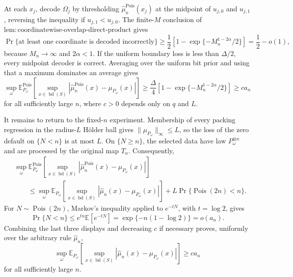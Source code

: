 At each \(x_j\), decode \(\Omega_j\) by thresholding \(\widehat\mu_n^{\mathrm{Pois}}(x_j)\) at the midpoint of \(u_{j,0}\) and \(u_{j,1}\), reversing the inequality if \(u_{j,1}<u_{j,0}\).  The finite-\(M\) conclusion of \(\mathrm{lem:coordinatewise\text{-}overlap\text{-}direct\text{-}product}\) gives
\[
 \Pr\{\text{at least one coordinate is decoded incorrectly}\}
 \geq\frac12\left[1-\exp\{-M_n^{1-2\alpha}/2\}\right]
 =\frac12-o(1),
\]
because \(M_n\to\infty\) and \(2\alpha<1\).  If the uniform boundary loss is less than \(\Delta/2\), every midpoint decoder is correct.  Averaging over the uniform bit prior and using that a maximum dominates an average gives
\[
 \sup_\omega
 \mathbb E_{P_\omega}^{\mathrm{Pois}}\!\left[
 \sup_{x\in\operatorname{bd}(S)}
 |\widehat\mu_n^{\mathrm{Pois}}(x)-\mu_{P_\omega}(x)|
 \right]
 \geq\frac{\Delta}{4}
 \left[1-\exp\{-M_n^{1-2\alpha}/2\}\right]
 \geq c a_n
\]
for all sufficiently large \(n\), where \(c>0\) depends only on \(q\) and \(L\).

It remains to return to the fixed-\(n\) experiment.  Membership of every packing regression in the radius-\(L\) H\"older ball gives \(\lVert\mu_{P_\omega}\rVert_\infty\leq L\), so the loss of the zero default on \(\{N<n\}\) is at most \(L\).  On \(\{N\geq n\}\), the selected data have law \(P_\omega^{\otimes n}\) and are processed by the original map \(T_n\).  Consequently,
\[
\begin{aligned}
 &\sup_\omega
 \mathbb E_{P_\omega}^{\mathrm{Pois}}\!\left[
 \sup_{x\in\operatorname{bd}(S)}
 |\widehat\mu_n^{\mathrm{Pois}}(x)-\mu_{P_\omega}(x)|
 \right]\\
 &\qquad\leq
 \sup_\omega
 \mathbb E_{P_\omega}\!\left[
 \sup_{x\in\operatorname{bd}(S)}
 |\widehat\mu_n(x)-\mu_{P_\omega}(x)|
 \right]
 +L\Pr\{\operatorname{Pois}(2n)<n\}.
\end{aligned}
\]
For \(N\sim\operatorname{Pois}(2n)\), Markov's inequality applied to \(e^{-tN}\), with \(t=\log2\), gives
\[
 \Pr\{N<n\}
 \leq e^{tn}\mathbb E[e^{-tN}]
 =\exp\{-n(1-\log2)\}
 =o(a_n).
\]
Combining the last three displays and decreasing \(c\) if necessary proves, uniformly over the arbitrary rule \(\widehat\mu_n\),
\[
 \sup_\omega
 \mathbb E_{P_\omega}\!\left[
 \sup_{x\in\operatorname{bd}(S)}
 |\widehat\mu_n(x)-\mu_{P_\omega}(x)|
 \right]
 \geq c a_n
\]
for all sufficiently large \(n\).

